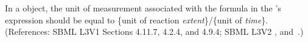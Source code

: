 In a \KineticLaw object, the unit of measurement associated with the
formula in the \KineticLaw's  expression should be equal to
\{unit of reaction \emph{extent}\}/\{unit of \emph{time}\}.  (References:
SBML L3V1 Sections 4.11.7, 4.2.4, and 4.9.4; SBML L3V2 , 
and~.)
